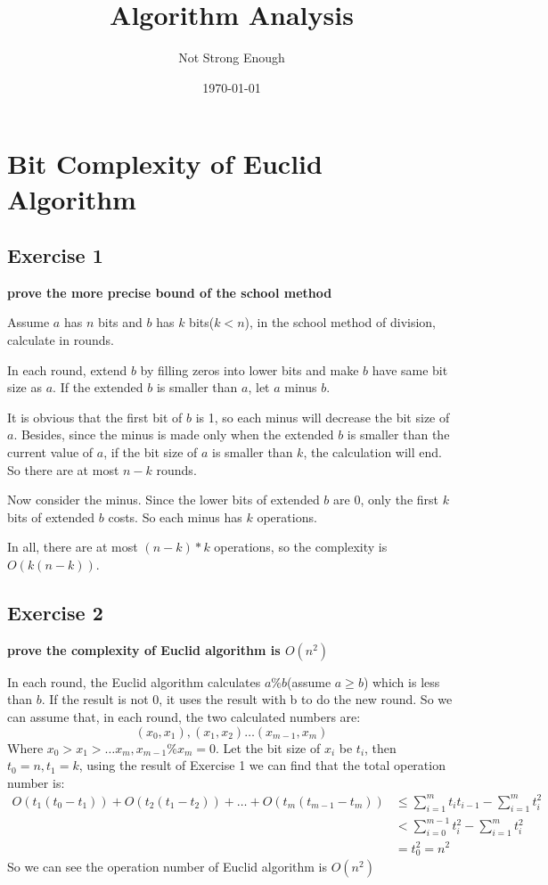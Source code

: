 \documentclass[UTF8, a4paper, linespread=1.5]{article}
\title{Algorithm Analysis}
\date{\today}
\author{Not Strong Enough}
\begin{document}
\maketitle

\section{Bit Complexity of Euclid Algorithm}

\subsection{Exercise 1}

{\bfseries prove the more precise bound of the school method}

Assume $a$ has $n$ bits and $b$ has $k$ bits($k < n$), in the school method of division, 
calculate in rounds. 

In each round, extend $b$ by filling zeros into lower bits and make $b$ have same bit size as $a$. 
If the extended $b$ is smaller than $a$, let $a$ minus $b$. 

It is obvious that the first bit of $b$ is 1, so each minus will decrease the bit size of $a$. 
Besides, since the minus is made only when the extended $b$ is smaller than the current value of $a$, 
if the bit size of $a$ is smaller than $k$, the calculation will end. 
So there are at most $n-k$ rounds. 

Now consider the minus. Since the lower bits of extended $b$ are 0, only the first $k$ bits of extended $b$ 
costs. So each minus has $k$ operations. 

In all, there are at most $(n-k)*k$ operations, so the complexity is $O(k(n-k))$. 

\subsection{Exercise 2}

{\bfseries prove the complexity of Euclid algorithm is $O(n^2)$}

In each round, the Euclid algorithm calculates $a\%b$(assume $a\geq b$) which is less than $b$. 
If the result is not 0, it uses the result with b to do the new round. So we can assume that, in each round, 
the two calculated numbers are: 
$$(x_0, x_1), (x_1, x_2)\dots (x_{m-1}, x_m)$$
Where $x_0>x_1>\dots x_m, x_{m-1}\%x_m=0$. 
Let the bit size of $x_i$ be $t_i$, then $t_0=n, t_1=k$, 
using the result of Exercise 1 we can find that the total operation number is: 
\begin{align}
O(t_1(t_0-t_1))+O(t_2(t_1-t_2))+\dots + O(t_m(t_{m-1}-t_m)) &\leq\sum_{i=1}^m t_i t_{i-1}-\sum_{i=1}^m t_i^2\\
&<\sum_{i=0}^{m-1} t_i^2 -\sum_{i=1}^m t_i^2\\
&=t_0^2=n^2
\end{align}
So we can see the operation number of Euclid algorithm is $O(n^2)$
\end{document}
